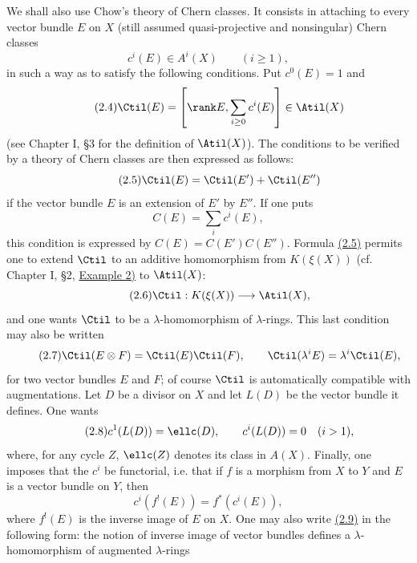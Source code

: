 We shall also use Chow's theory of Chern classes. It consists in attaching to every vector bundle $E$ on $X$ (still assumed quasi-projective and nonsingular) Chern classes
\[
 c^i(E)\in A^i(X)\qquad (i\geq 1),
\]
in such a way as to satisfy the following conditions. Put $c^0(E)=1$ and
\begin{equation}\tag{2.4}
 \Ctil(E)=\left[\rank E,\sum_{i\geq 0}c^i(E)\right]\in \Atil(X)
\end{equation}
(see Chapter I, \S 3 for the definition of $\Atil(X)$). The conditions to be verified by a theory of Chern classes are then expressed as follows:
\begin{equation}\tag{2.5}
 \Ctil(E)=\Ctil(E')+\Ctil(E'')
\end{equation}
if the vector bundle $E$ is an extension of $E'$ by $E''$. If one puts
\[
 C(E)=\sum_i c^i(E),
\]
this condition is expressed by $C(E)=C(E')C(E'')$. Formula \hyperlink{sga6.e00.eq.2-5}{(2.5)} permits one to extend $\Ctil$ to an additive homomorphism from $K(\xi(X))$ (cf. Chapter I, \S 2, \hyperlink{sga6.e00.ex.2-2}{Example 2)} to $\Atil(X)$:
\begin{equation}\tag{2.6}
 \Ctil:K(\xi(X))\longrightarrow \Atil(X),
\end{equation}
and one wants $\Ctil$ to be a $\lambda$-homomorphism of $\lambda$-rings. This last condition may also be written
\begin{equation}\tag{2.7}
 \Ctil(E\otimes F)=\Ctil(E)\Ctil(F),\qquad
 \Ctil(\lambda^iE)=\lambda^i\Ctil(E),
\end{equation}
for two vector bundles $E$ and $F$; of course $\Ctil$ is automatically compatible with augmentations. Let $D$ be a divisor on $X$ and let $L(D)$ be the vector bundle it defines. One wants
\begin{equation}\tag{2.8}
 c^1(L(D))=\ellc(D),\qquad c^i(L(D))=0\quad (i>1),
\end{equation}
where, for any cycle $Z$, $\ellc(Z)$ denotes its class in $A(X)$. Finally, one imposes that the $c^i$ be functorial, i.e. that if $f$ is a morphism from $X$ to $Y$ and $E$ is a vector bundle on $Y$, then
\begin{equation}\tag{2.9}
 c^i(f^!(E))=f^*(c^i(E)),
\end{equation}
where $f^!(E)$ is the inverse image of $E$ on $X$. One may also write \hyperlink{sga6.e00.eq.2-9}{(2.9)} in the following form: the notion of inverse image of vector bundles defines a $\lambda$-homomorphism of augmented $\lambda$-rings
